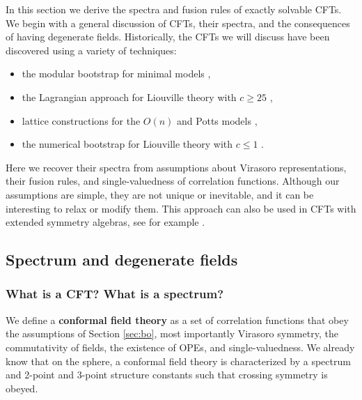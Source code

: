 \documentclass[12pt, a4paper]{article}
\newcommand{\myindex}[1]{\textbf{\boldmath #1}}
\begin{document}
In this section we derive the spectra and fusion rules of exactly solvable CFTs. We begin with a general discussion of CFTs, their spectra, and the consequences of having degenerate fields. Historically, the CFTs we will discuss have been discovered using a variety of techniques:
\begin{itemize}
 \item the modular bootstrap for minimal models \cite{fms97},
 \item the Lagrangian approach for Liouville theory with $c\geq 25$ \cite{zz95},
 \item lattice constructions for the $O(n)$ and Potts models \cite{fsz87},
 \item the numerical bootstrap for Liouville theory with $c\leq 1$ \cite{rs15}.
\end{itemize}
Here we recover their spectra from assumptions about Virasoro representations, their fusion rules, and single-valuedness of correlation functions. Although our assumptions are simple, they are not unique or inevitable, and it can be interesting to relax or modify them. This approach can also be used in CFTs with extended symmetry algebras, see for example \cite{bp24}.

\subsection{Spectrum and degenerate fields}

\subsubsection{What is a CFT? What is a spectrum?}

We define a \myindex{conformal field theory} as a set of correlation functions that obey the assumptions of Section \ref{sec:bo}, most importantly Virasoro symmetry, the commutativity of fields, the existence of OPEs, and single-valuedness. We already know that on the sphere, a conformal field theory is characterized by a spectrum and 2-point and 3-point structure constants such that crossing symmetry is obeyed.
\end{document}
